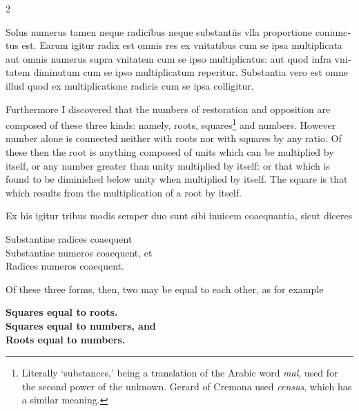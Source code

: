 \documentclass[11pt,a4paper,twoside]{book}
\newcommand{\latincolumn}[1]{\textlatin{\small #1}}
\newcommand{\englishcolumn}[1]{\small #1}
\begin{document}
\begin{paracol}{2}
\medskip

\latincolumn{Solus numerus tamen neque radicibus neque substantiis vlla proportione coniunctus est. Earum igitur radix est omnis res ex vnitatibus cum se ipsa multiplicata aut omnis numerus supra vnitatem cum se ipso multiplicatus: aut quod infra vnitatem diminutum cum se ipso multiplicatum reperitur. Substantia vero est omne illud quod ex multiplicatione radicis cum se ipsa colligitur.}

\switchcolumn

\englishcolumn{Furthermore I discovered that the numbers of restoration and opposition are composed of these three kinds: namely, roots, squares\footnote{Literally `substances,' being a translation of the Arabic word \textit{mal}, used for the second power of the unknown. Gerard of Cremona used \textit{census}, which has a similar meaning.} and numbers. However number alone is connected neither with roots nor with squares by any ratio. Of these then the root is anything composed of units which can be multiplied by itself, or any number greater than unity multiplied by itself: or that which is found to be diminished below unity when multiplied by itself. The square is that which results from the multiplication of a root by itself.}

\switchcolumn*

\latincolumn{Ex his igitur tribus modis semper duo sunt sibi inuicem coaequantia, sicut diceres}

\begin{center}
\latincolumn{Substantiae radices coaequent}\\
\latincolumn{Substantiae numeros coaequent, et}\\
\latincolumn{Radices numeros coaequent.}
\end{center}

\switchcolumn

\englishcolumn{Of these three forms, then, two may be equal to each other, as for example}

\begin{center}
\textbf{Squares equal to roots.}\\
\textbf{Squares equal to numbers, and}\\
\textbf{Roots equal to numbers.}
\end{center}

\switchcolumn*


\end{paracol}
\end{document}
